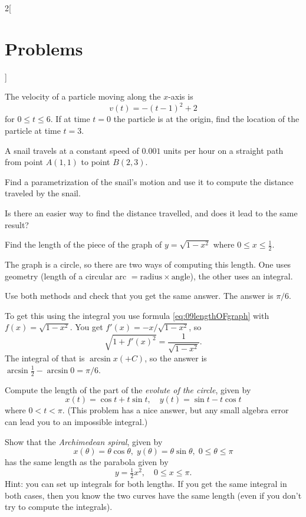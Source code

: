 \begin{multicols}{2}[
\section{Problems}
\problemfont
]\setlength{\parindent}{0pt}

\problem The velocity of a particle moving along the $x$-axis is
\[
  v(t)=-(t-1)^2+2
\]
for $0 \leq t \leq 6$. If at time $t=0$ the particle is at the origin, find the
location of the particle at time $t=3$.

\problem A snail travels at a constant speed of $0.001$ units per hour on a
straight path from point $A(1,1)$ to point $B(2,3)$.

\subprob Find a parametrization of the snail's motion and use it to compute the
distance traveled by the snail.

\subprob Is there an easier way to find the distance travelled, and does it
lead to the same result?

\problem Find the length of the piece of the graph of $y=\sqrt{1-x^2}$ where
$0\le x\le \frac12$.

The graph is a circle, so there are two ways of computing this
length.  One uses geometry (length of a circular arc $=
\textrm{radius} \times \textrm{angle}$), the other uses an integral.

Use both methods and check that you get the same answer.
\answer
The answer is $\pi/6$.

To get this using the integral you use formula
\eqref{eq:09lengthOFgraph} with $f(x) = \sqrt{1-x^2}$.
You get $f'(x) = -x/\sqrt{1-x^2}$, so 
\[
\sqrt{1+f'(x)^2} = \frac{1}{\sqrt{1-x^2}}.
\]
The integral of that is $\arcsin x (+C)$, so the answer is
$\arcsin\tfrac12 - \arcsin 0 = \pi/6$.
\endanswer

\problem Compute the length of the part of the \textit{evolute of the circle},
given by
\[
x(t) = \cos t + t\sin t, \quad y(t) = \sin t - t\cos t
\]
where $0<t<\pi$.
(This problem has a nice answer, but any small algebra error can lead you to an
impossible integral.)

\problem \groupproblem Show that the \textit{Archimedean spiral}, given by
\[
x(\theta) = \theta\cos\theta, \; y(\theta) = \theta\sin\theta,\;
0\le \theta\le \pi
\]
has the same length as the parabola given by
\[
y=\tfrac12 x^2,\quad 0\le x\le \pi.
\]
Hint: you can set up integrals for both lengths.  If you get the same
integral in both cases, then you know the two curves have the same
length (even if you don't try to compute the integrals).


\end{multicols}
